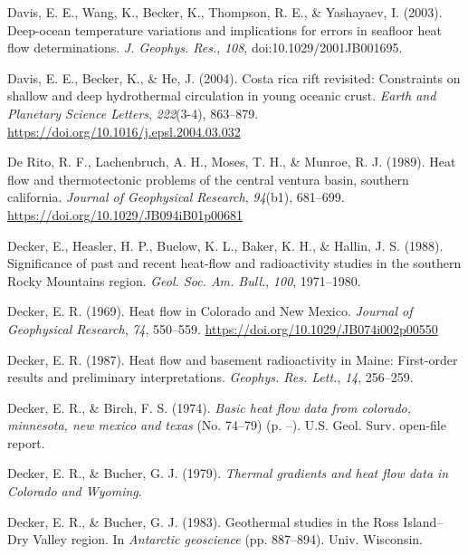\begin{CSLReferences}{1}{1}
\leavevmode{}%
Davis, E. E., Wang, K., Becker, K., Thompson, R. E., \& Yashayaev, I. (2003). Deep-ocean temperature variations and implications for errors in seafloor heat flow determinations. \emph{J. Geophys. Res.}, \emph{108}, doi:10.1029/2001JB001695.

\leavevmode{}%
Davis, E. E., Becker, K., \& He, J. (2004). Costa rica rift revisited: Constraints on shallow and deep hydrothermal circulation in young oceanic crust. \emph{Earth and Planetary Science Letters}, \emph{222}(3-4), 863--879. \url{https://doi.org/10.1016/j.epsl.2004.03.032}

\leavevmode{}%
De Rito, R. F., Lachenbruch, A. H., Moses, T. H., \& Munroe, R. J. (1989). Heat flow and thermotectonic problems of the central ventura basin, southern california. \emph{Journal of Geophysical Research}, \emph{94}(b1), 681--699. \url{https://doi.org/10.1029/JB094iB01p00681}

\leavevmode{}%
Decker, E., Heasler, H. P., Buelow, K. L., Baker, K. H., \& Hallin, J. S. (1988). Significance of past and recent heat-flow and radioactivity studies in the southern {Rocky Mountains} region. \emph{Geol. Soc. Am. Bull.}, \emph{100}, 1971--1980.

\leavevmode{}%
Decker, E. R. (1969). Heat flow in {Colorado and New Mexico}. \emph{Journal of Geophysical Research}, \emph{74}, 550--559. \url{https://doi.org/10.1029/JB074i002p00550}

\leavevmode{}%
Decker, E. R. (1987). Heat flow and basement radioactivity in {Maine}: First-order results and preliminary interpretations. \emph{Geophys. Res. Lett.}, \emph{14}, 256--259.

\leavevmode{}%
Decker, E. R., \& Birch, F. S. (1974). \emph{Basic heat flow data from colorado, minnesota, new mexico and texas} (No. 74--79) (p. --). U.S. Geol. Surv. open-file report.

\leavevmode{}%
Decker, E. R., \& Bucher, G. J. (1979). \emph{Thermal gradients and heat flow data in {Colorado and Wyoming}}.

\leavevmode{}%
Decker, E. R., \& Bucher, G. J. (1983). Geothermal studies in the {Ross Island--Dry Valley} region. In \emph{Antarctic geoscience} (pp. 887--894). Univ. Wisconsin.


\end{CSLReferences}
